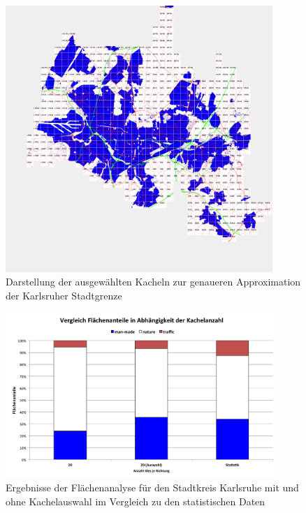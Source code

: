 \begin{figure}
  \centering
    \includegraphics[width=0.9\textwidth]{images/3_KA_Kacheln_skip_ohne_zahlen.png}
    \caption{Darstellung der ausgewählten Kacheln zur genaueren Approximation der Karlsruher Stadtgrenze}
    \label{fig:Karlsruhe_skip_tiles}
\end{figure}

\begin{figure}
  \centering
    \includegraphics[width=0.92\textwidth]{images/3_Kachelvergleich_KA_skip.png}
    \caption{Ergebnisse der Flächenanalyse für den Stadtkreis Karlsruhe mit und ohne Kachelauswahl im Vergleich zu den statistischen Daten}
    \label{fig:Kachel_skip_vgl}
\end{figure}

